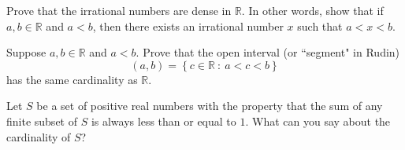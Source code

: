 \documentclass[12pt,letterpaper,boxed,cm]{hmcpset}
\newcommand{\pn}[1]{\left( #1 \right)}
\newcommand{\set}[1]{\left\{#1\right\}}
\newcommand{\R}[0]{\mathbb{R}}
\begin{document}

\begin{problem}[(1)]
    Prove that the irrational numbers are dense in $\R$.  In other words, show that if $a, b \in \R$ and $a < b$, then there exists an irrational number $x$ such that $a < x < b$.
\end{problem}

\begin{solution}
    \vfill
\end{solution}
\newpage

\begin{problem}[(2)]
    Suppose $a,b\in\R$ and $a<b$. Prove that the open interval (or ``segment" in Rudin)
    \[
        \pn{a,b} = \set{c\in\R\ :\ a<c<b}
    \]
    has the same cardinality as $\R$.
\end{problem}

\begin{solution}
    \vfill
\end{solution}
\newpage

\begin{problem}[(3)]
    Let $S$ be a set of positive real numbers with the property that the sum of any finite subset of $S$ is always less than or equal to $1$.  What can you say about the cardinality of $S$?
\end{problem}

\begin{solution}
    \vfill
\end{solution}
\newpage
\end{document}
